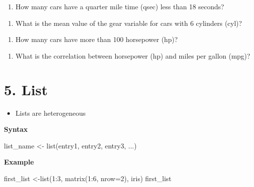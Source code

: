 \documentclass[
  letterpaper,
  DIV=11,
  numbers=noendperiod]{scrreprt}
\newenvironment{Shaded}{\begin{snugshade}}{\end{snugshade}}
\newcommand{\AttributeTok}[1]{\textcolor[rgb]{0.40,0.45,0.13}{#1}}
\newcommand{\DecValTok}[1]{\textcolor[rgb]{0.68,0.00,0.00}{#1}}
\newcommand{\FunctionTok}[1]{\textcolor[rgb]{0.28,0.35,0.67}{#1}}
\newcommand{\NormalTok}[1]{\textcolor[rgb]{0.00,0.23,0.31}{#1}}
\newcommand{\OtherTok}[1]{\textcolor[rgb]{0.00,0.23,0.31}{#1}}
\newcommand{\SpecialCharTok}[1]{\textcolor[rgb]{0.37,0.37,0.37}{#1}}
\providecommand{\tightlist}{%
  \setlength{\itemsep}{0pt}\setlength{\parskip}{0pt}}\usepackage{longtable,booktabs,array}
\begin{document}
\begin{enumerate}
\def\labelenumi{\arabic{enumi}.}
\setcounter{enumi}{17}
\tightlist
\item
  How many cars have a quarter mile time (qsec) less than 18 seconds?
\end{enumerate}

\begin{enumerate}
\def\labelenumi{\arabic{enumi}.}
\setcounter{enumi}{18}
\tightlist
\item
  What is the mean value of the gear variable for cars with 6 cylinders
  (cyl)?
\end{enumerate}

\begin{enumerate}
\def\labelenumi{\arabic{enumi}.}
\setcounter{enumi}{19}
\tightlist
\item
  How many cars have more than 100 horsepower (hp)?
\end{enumerate}

\begin{enumerate}
\def\labelenumi{\arabic{enumi}.}
\setcounter{enumi}{20}
\tightlist
\item
  What is the correlation between horsepower (hp) and miles per gallon
  (mpg)?
\end{enumerate}

\section{5. List}\label{list}

\begin{itemize}
\tightlist
\item
  Lists are heterogeneous
\end{itemize}

\textbf{Syntax}

\begin{Shaded}
\begin{Highlighting}[]
\NormalTok{list\_name }\OtherTok{\textless{}{-}} \FunctionTok{list}\NormalTok{(entry1, entry2, entry3, ...)}
\end{Highlighting}
\end{Shaded}

\textbf{Example}

\begin{Shaded}
\begin{Highlighting}[]
\NormalTok{first\_list }\OtherTok{\textless{}{-}}\FunctionTok{list}\NormalTok{(}\DecValTok{1}\SpecialCharTok{:}\DecValTok{3}\NormalTok{, }\FunctionTok{matrix}\NormalTok{(}\DecValTok{1}\SpecialCharTok{:}\DecValTok{6}\NormalTok{, }\AttributeTok{nrow=}\DecValTok{2}\NormalTok{), iris)}
\NormalTok{first\_list}
\end{Highlighting}
\end{Shaded}
\end{document}
